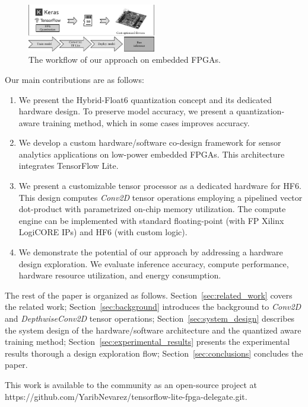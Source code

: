 \begin{figure}[t!]
	\centering
	\includegraphics[width=0.5\textwidth]{../figures/workflow.pdf}
	\caption{The workflow of our approach on embedded FPGAs.}
	\label{fig:workflow}
\end{figure}

Our main contributions are as follows:
\begin{enumerate}
	\item
	
	We present the Hybrid-Float6 quantization concept and its dedicated hardware design. To preserve model accuracy, we present a quantization-aware training method, which in some cases improves accuracy.
	
	\item We develop a custom hardware/software co-design framework for sensor analytics applications on low-power embedded FPGAs. This architecture integrates TensorFlow Lite.
	\item We present a customizable tensor processor as a dedicated hardware for HF6. This design computes \emph{Conv2D} tensor operations employing a pipelined vector dot-product with parametrized on-chip memory utilization. The compute engine can be implemented with standard floating-point (with FP Xilinx LogiCORE IPs) and HF6 (with custom logic).
	\item We demonstrate the potential of our approach by addressing a hardware design exploration. We evaluate inference accuracy, compute performance, hardware resource utilization, and energy consumption.
\end{enumerate}

The rest of the paper is organized as follows. Section~\ref{sec:related_work} covers the related work; Section~\ref{sec:background} introduces the background to \emph{Conv2D} and \emph{DepthwiseConv2D} tensor operations; Section~\ref{sec:system_design} describes the system design of the hardware/software architecture and the quantized aware training method; Section~\ref{sec:experimental_results} presents the experimental results thorough a design exploration flow; Section~\ref{sec:conclusions} concludes the paper.

This work is available to the community as an open-source project at https://github.com/YaribNevarez/tensorflow-lite-fpga-delegate.git.